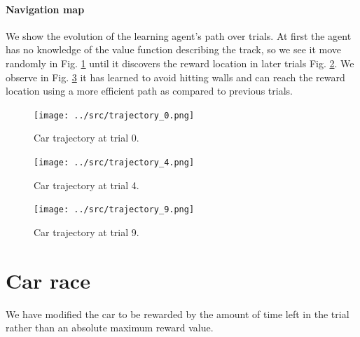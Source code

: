 \newpage
\paragraph{Navigation map}

We show the evolution of the learning agent's path over trials. At first the agent has no knowledge of the value function describing the track, so we see it move randomly in Fig. \ref{fig:trial0} until it discovers the reward location in later trials Fig. \ref{fig:trial4}. We observe in Fig. \ref{fig:trial9} it has learned to avoid hitting walls and can reach the reward location using a more efficient path as compared to previous trials. 

\begin{figure}[h!]
\centering
\texttt{[image: ../src/trajectory\_0.png]}
\caption{Car trajectory at trial 0. \label{fig:trial0}}
\end{figure}


\begin{figure}[h!]
\centering
\texttt{[image: ../src/trajectory\_4.png]}
\caption{Car trajectory at trial 4. \label{fig:trial4}}
\end{figure}

\begin{figure}[h!]
\centering
\texttt{[image: ../src/trajectory\_9.png]}
\caption{Car trajectory at trial 9. \label{fig:trial9}}
\end{figure}

\section{Car race}
We have modified the car to be rewarded by the amount of time left in the trial rather than an absolute maximum reward value. 
